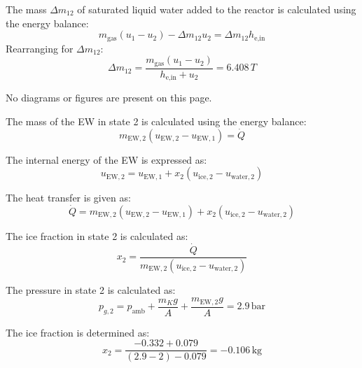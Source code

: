 The mass \( \Delta m_{12} \) of saturated liquid water added to the reactor is calculated using the energy balance:  
\[
m_{\text{gas}} (u_1 - u_2) - \Delta m_{12} u_2 = \Delta m_{12} h_{\text{e,in}}
\]  
Rearranging for \( \Delta m_{12} \):  
\[
\Delta m_{12} = \frac{m_{\text{gas}} (u_1 - u_2)}{h_{\text{e,in}} + u_2} = 6.408 \, T
\]  

No diagrams or figures are present on this page.

The mass of the EW in state 2 is calculated using the energy balance:  
\[
m_{\text{EW},2} (u_{\text{EW},2} - u_{\text{EW},1}) = \dot{Q}
\]  

The internal energy of the EW is expressed as:  
\[
u_{\text{EW},2} = u_{\text{EW},1} + x_2 (u_{\text{ice},2} - u_{\text{water},2})
\]  

The heat transfer is given as:  
\[
\dot{Q} = m_{\text{EW},2} (u_{\text{EW},2} - u_{\text{EW},1}) + x_2 (u_{\text{ice},2} - u_{\text{water},2})
\]  

The ice fraction in state 2 is calculated as:  
\[
x_2 = \frac{\dot{Q}}{m_{\text{EW},2} (u_{\text{ice},2} - u_{\text{water},2})}
\]  

The pressure in state 2 is calculated as:  
\[
p_{g,2} = p_{\text{amb}} + \frac{m_K g}{A} + \frac{m_{\text{EW},2} g}{A} = 2.9 \, \text{bar}
\]  

The ice fraction is determined as:  
\[
x_2 = \frac{-0.332 + 0.079}{(2.9 - 2) - 0.079} = -0.106 \, \text{kg}
\]